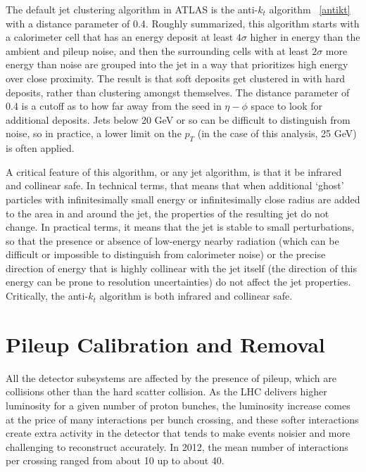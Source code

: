 The default jet clustering algorithm in ATLAS is the anti-$k_t$ algorithm ~\ref{antikt}
with a distance parameter of 0.4.  Roughly summarized, this algorithm starts with a calorimeter cell that 
has an energy deposit at least $4\sigma$ higher in energy than the ambient and pileup noise, 
and then the surrounding cells with at least $2\sigma$ more energy than noise are grouped into 
the jet in a way that prioritizes high energy over close proximity.  The result is that soft deposits get 
clustered in with hard deposits, rather than clustering amongst themselves.  The distance parameter of 0.4 is 
a cutoff as to how far away from the seed in $\eta-\phi$ space to look for 
additional deposits.   Jets below 20 GeV or so can be difficult to distinguish from noise, so in practice, a lower limit on 
the $p_T$ (in the case of this analysis, 25 GeV) is often applied.  

A critical feature of this algorithm, or any jet algorithm, is that it be infrared and collinear safe.  In technical terms, that means that when additional `ghost' particles with infinitesimally small energy or infinitesimally close radius are added to the area in and around the jet, the properties of the resulting jet do not change.  In practical terms, it means that the jet is stable to small perturbations, so that the presence or absence of low-energy nearby radiation (which can be difficult or impossible to distinguish from calorimeter noise) or the precise direction of energy that is highly collinear with the jet itself (the direction of this energy can be prone to resolution uncertainties) do not affect the jet properties.  Critically, the anti-$k_t$ algorithm is both infrared and collinear safe.








\section{Pileup Calibration and Removal}
\label{sec:pileup}
All the detector subsystems are affected by the presence of pileup, which are collisions other than the hard scatter 
collision.  As the LHC delivers higher luminosity for a given number of proton bunches, the luminosity increase comes 
at the price of many interactions per bunch crossing, and these softer interactions create extra activity in the detector 
that tends to make events noisier and more challenging to reconstruct accurately.  In 2012, the mean number of 
interactions per crossing ranged from about 10 up to about 40.  

